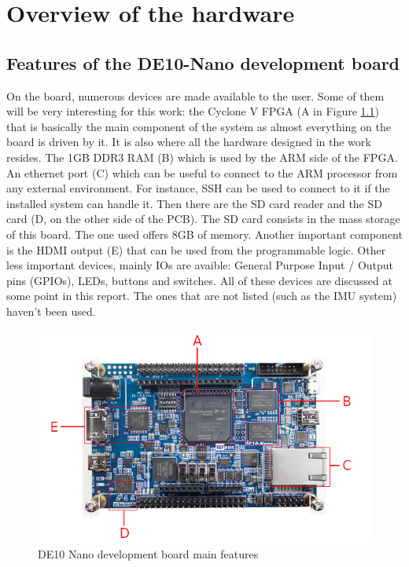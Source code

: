 \chapter{Overview of the hardware}

\section{Features of the DE10-Nano development board}

On the board, numerous devices are made available to the user. Some of them will be very 
interesting for this work: the Cyclone V FPGA (A in Figure \ref{fig:de10/de10_features}) that is
basically the main component of the system as almost everything on the board is driven by it. It is
also where all the hardware designed in the work resides. The 1GB DDR3 RAM (B) which is used 
by the ARM side of the FPGA. An ethernet port (C) which can be
useful to connect to the ARM processor from any external environment. For instance, SSH can be used
to connect to it if the installed system can handle it. Then there are the SD card reader and the SD 
card (D, on the other side of the PCB). The SD card consists in the mass storage of this board. The
one used offers 8GB of memory. Another important component is the HDMI output (E) that can be used
from the programmable logic. Other less important devices, mainly IOs are avaible: General Purpose 
Input / Output pins (GPIOs), LEDs, buttons and switches. All of these devices are discussed at some
point in this report. The ones that are not listed (such as the IMU system) haven't been used.

\begin{figure}[H]
    \centering
    \includegraphics[scale=0.5]{Chapter1-Hardware/res/de10_nano.png}
    \caption{DE10 Nano development board main features}
    \label{fig:de10/de10_features}
\end{figure}

